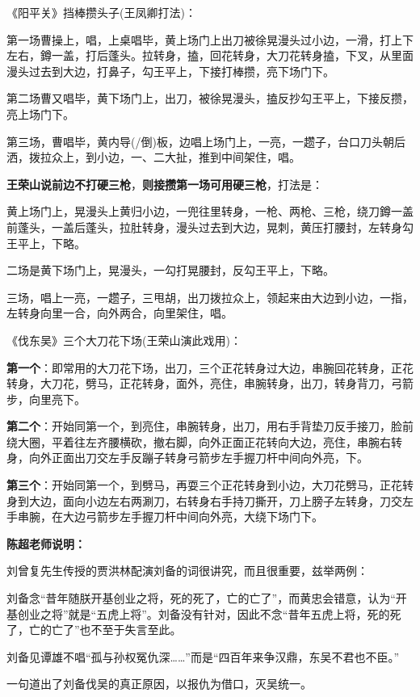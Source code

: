 《阳平关》挡棒攒头子(王凤卿打法)：

第一场曹操上，唱，上桌唱毕，黄上场门上出刀被徐晃漫头过小边，一滑，打上下左右，鐏一盖，打后蓬头。拉转身，搕，回花转身，大刀花转身搕，下叉，从里面漫头过去到大边，打鼻子，勾王平上，下接打棒攒，亮下场门下。

第二场曹又唱毕，黄下场门上，出刀，被徐晃漫头，搕反抄勾王平上，下接反攒，亮上场门下。

第三场，曹唱毕，黄内导(/倒)板，边唱上场门上，一亮，一趱子，台口刀头朝后洒，拨拉众上，到小边，一、二大扯，推到中间架住，唱。

\textbf{王荣山说前边不打硬三枪}，\textbf{则接攒第一场可用硬三枪}，打法是：

黄上场门上，晃漫头上黄归小边，一兜往里转身，一枪、两枪、三枪，绕刀鐏一盖前蓬头，一盖后蓬头，拉肚转身，漫头过去到大边，晃刺，黄压打腰封，左转身勾王平上，下略。

二场是黄下场门上，晃漫头，一勾打晃腰封，反勾王平上，下略。

三场，唱上一亮，一趱子，三甩胡，出刀拨拉众上，领起来由大边到小边，一指，左转身向里一合，向外两合，向里架住，唱。

《伐东吴》三个大刀花下场(王荣山演此戏用)：

\textbf{第一个}：即常用的大刀花下场，出刀，三个正花转身过大边，串腕回花转身，正花转身，大刀花，劈马，正花转身，面外，亮住，串腕转身，出刀，转身背刀，弓箭步，向里亮下。

\textbf{第二个}：开始同第一个，到亮住，串腕转身，出刀，用右手背垫刀反手接刀，脸前绕大圈，平着往左齐腰横砍，撤右脚，向外正面正花转向大边，亮住，串腕右转身，向外正面出刀交左手反蹦子转身弓箭步左手握刀杆中间向外亮，下。

\textbf{第三个}：开始同第一个，到劈马，再耍三个正花转身到小边，大刀花劈马，正花转身到大边，面向小边左右两涮刀，右转身右手持刀撕开，刀上膀子左转身，刀交左手串腕，在大边弓箭步左手握刀杆中间向外亮，大绕下场门下。

\textbf{陈超老师说明：}

刘曾复先生传授的贾洪林配演刘备的词很讲究，而且很重要，兹举两例：

刘备念``昔年随朕开基创业之将，死的死了，亡的亡了''，而黄忠会错意，认为``开基创业之将''就是``五虎上将''。刘备没有针对，因此不念``昔年五虎上将，死的死了，亡的亡了''也不至于失言至此。

刘备见谭雄不唱``孤与孙权冤仇深\ldots{}\ldots{}''而是``四百年来争汉鼎，东吴不君也不臣。''

一句道出了刘备伐吴的真正原因，以报仇为借口，灭吴统一。

